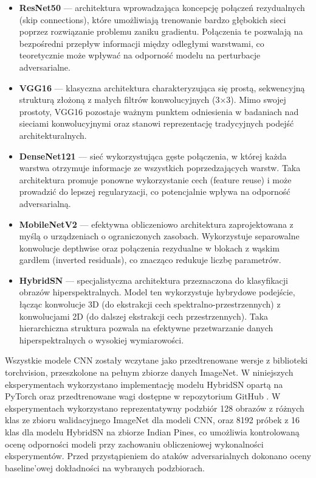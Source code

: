 \documentclass[12pt]{article}
\begin{document}
\begin{itemize}
    \item \textbf{ResNet50} \supercite{he2016deep} --- architektura wprowadzająca koncepcję połączeń rezydualnych (skip connections), które umożliwiają trenowanie bardzo głębokich sieci poprzez rozwiązanie problemu zaniku gradientu. Połączenia te pozwalają na bezpośredni przepływ informacji między odległymi warstwami, co teoretycznie może wpływać na odporność modelu na perturbacje adversarialne.
    \item \textbf{VGG16} \supercite{simonyan2014very} --- klasyczna architektura charakteryzująca się prostą, sekwencyjną strukturą złożoną z małych filtrów konwolucyjnych (3×3). Mimo swojej prostoty, VGG16 pozostaje ważnym punktem odniesienia w badaniach nad sieciami konwolucyjnymi oraz stanowi reprezentację tradycyjnych podejść architekturalnych.
    \item \textbf{DenseNet121} \supercite{huang2017densely} --- sieć wykorzystująca gęste połączenia, w której każda warstwa otrzymuje informacje ze wszystkich poprzedzających warstw. Taka architektura promuje ponowne wykorzystanie cech (feature reuse) i może prowadzić do lepszej regularyzacji, co potencjalnie wpływa na odporność adversarialną.
    \item \textbf{MobileNetV2} \supercite{sandler2018mobilenetv2} --- efektywna obliczeniowo architektura zaprojektowana z myślą o urządzeniach o ograniczonych zasobach. Wykorzystuje separowalne konwolucje depthwise oraz połączenia rezydualne w blokach z wąskim gardłem (inverted residuals), co znacząco redukuje liczbę parametrów.    
    \item \textbf{HybridSN} \supercite{roy2019hybridsn} --- specjalistyczna architektura przeznaczona do klasyfikacji obrazów hiperspektralnych. Model ten wykorzystuje hybrydowe podejście, łącząc konwolucje 3D (do ekstrakcji cech spektralno-przestrzennych) z konwolucjami 2D (do dalszej ekstrakcji cech przestrzennych). Taka hierarchiczna struktura pozwala na efektywne przetwarzanie danych hiperspektralnych o wysokiej wymiarowości.
\end{itemize}

Wszystkie modele CNN zostały wczytane jako przedtrenowane wersje z biblioteki torchvision, przeszkolone na pełnym zbiorze danych ImageNet. W niniejszych eksperymentach wykorzystano implementację modelu HybridSN opartą na PyTorch oraz przedtrenowane wagi dostępne w repozytorium GitHub \supercite{hybridsn_implementation}. W eksperymentach wykorzystano reprezentatywny podzbiór 128 obrazów z różnych klas ze zbioru walidacyjnego ImageNet dla modeli CNN, oraz 8192 próbek z 16 klas dla modelu HybridSN na zbiorze Indian Pines, co umożliwia kontrolowaną ocenę odporności modeli przy zachowaniu obliczeniowej wykonalności eksperymentów. Przed przystąpieniem do ataków adversarialnych dokonano oceny baseline'owej dokładności na wybranych podzbiorach.
\end{document}
